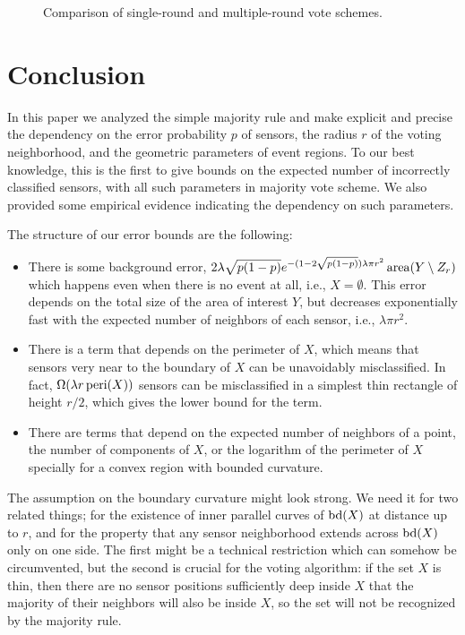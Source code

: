 \documentclass{article}
\def\area{\mathop{\rm area}}
\def\bd{\mathop{\rm bd}}
\def\peri{\mathop{\rm peri}}
\begin{document}
\begin{figure}
\centering
\mbox{}
\mbox{}
\mbox{}
\caption{Comparison of single-round and multiple-round vote schemes.}
\label{fig:sim-s-m}
\end{figure}

\section{Conclusion}
In this paper we analyzed the simple majority rule and make explicit and precise the dependency on the error probability $p$ of sensors, the radius $r$ of the voting neighborhood, and the geometric parameters of event regions. To our best knowledge, this is the first to give bounds on the expected number of incorrectly classified sensors, with all such parameters in majority vote scheme. We also provided some empirical evidence indicating the dependency on such parameters.

The structure of our error bounds are the following:
\begin{itemize}
\item There is some background error, $2\lambda\sqrt{p(1-p)} e^{-(1-2\sqrt{p(1-p)})\lambda\pi r^2}\area(Y\setminus Z_r) $ which happens even when there is no event at all, i.e., $X=\emptyset$. This error depends on the total size of the area of interest $Y$, but decreases exponentially fast with the expected number of neighbors of each sensor, i.e., $\lambda\pi r^2$.

\item There is a term that depends on the perimeter of $X$, which means that sensors very near to the boundary of $X$ can be unavoidably misclassified. In fact, $\Omega(\lambda r \peri(X))$ sensors can be misclassified in a simplest thin rectangle of height $r/2$, which gives the lower bound for the term.

\item There are terms that depend on the expected number of neighbors of a point, the number of components of $X$, or the logarithm of the perimeter of $X$ specially for a convex region with bounded curvature.
\end{itemize}

\par
The assumption on the boundary curvature might look strong. We need it for two related things; for the existence of inner parallel curves of $\bd(X)$ at distance up to $r$, and for the property that any sensor neighborhood extends across $\bd(X)$ only on one side. The first might be a technical restriction which can somehow be circumvented, but the second is crucial for the voting algorithm: if the set $X$ is thin, then there are no sensor positions sufficiently deep inside $X$ that the majority of their neighbors will also be inside $X$, so the set will not be recognized by the majority rule.
\end{document}
